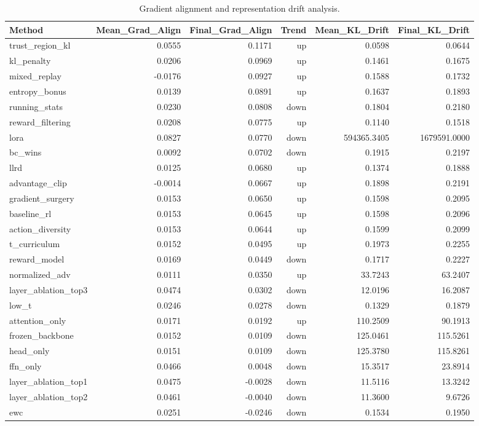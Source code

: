 \begin{table}[htbp]
\centering
\caption{Gradient alignment and representation drift analysis.}
\label{tab:gradient}
\begin{tabular}{lrrrrr}
\toprule
\textbf{Method} & \textbf{Mean\_Grad\_Align} & \textbf{Final\_Grad\_Align} & \textbf{Trend} & \textbf{Mean\_KL\_Drift} & \textbf{Final\_KL\_Drift} \\
\midrule
trust\_region\_kl & 0.0555 & 0.1171 & up & 0.0598 & 0.0644 \\
kl\_penalty & 0.0206 & 0.0969 & up & 0.1461 & 0.1675 \\
mixed\_replay & -0.0176 & 0.0927 & up & 0.1588 & 0.1732 \\
entropy\_bonus & 0.0139 & 0.0891 & up & 0.1637 & 0.1893 \\
running\_stats & 0.0230 & 0.0808 & down & 0.1804 & 0.2180 \\
reward\_filtering & 0.0208 & 0.0775 & up & 0.1140 & 0.1518 \\
lora & 0.0827 & 0.0770 & down & 594365.3405 & 1679591.0000 \\
bc\_wins & 0.0092 & 0.0702 & down & 0.1915 & 0.2197 \\
llrd & 0.0125 & 0.0680 & up & 0.1374 & 0.1888 \\
advantage\_clip & -0.0014 & 0.0667 & up & 0.1898 & 0.2191 \\
gradient\_surgery & 0.0153 & 0.0650 & up & 0.1598 & 0.2095 \\
baseline\_rl & 0.0153 & 0.0645 & up & 0.1598 & 0.2096 \\
action\_diversity & 0.0153 & 0.0644 & up & 0.1599 & 0.2099 \\
t\_curriculum & 0.0152 & 0.0495 & up & 0.1973 & 0.2255 \\
reward\_model & 0.0169 & 0.0449 & down & 0.1717 & 0.2227 \\
normalized\_adv & 0.0111 & 0.0350 & up & 33.7243 & 63.2407 \\
layer\_ablation\_top3 & 0.0474 & 0.0302 & down & 12.0196 & 16.2087 \\
low\_t & 0.0246 & 0.0278 & down & 0.1329 & 0.1879 \\
attention\_only & 0.0171 & 0.0192 & up & 110.2509 & 90.1913 \\
frozen\_backbone & 0.0152 & 0.0109 & down & 125.0461 & 115.5261 \\
head\_only & 0.0151 & 0.0109 & down & 125.3780 & 115.8261 \\
ffn\_only & 0.0466 & 0.0048 & down & 15.3517 & 23.8914 \\
layer\_ablation\_top1 & 0.0475 & -0.0028 & down & 11.5116 & 13.3242 \\
layer\_ablation\_top2 & 0.0461 & -0.0040 & down & 11.3600 & 9.6726 \\
ewc & 0.0251 & -0.0246 & down & 0.1534 & 0.1950 \\
\bottomrule
\end{tabular}
\end{table}